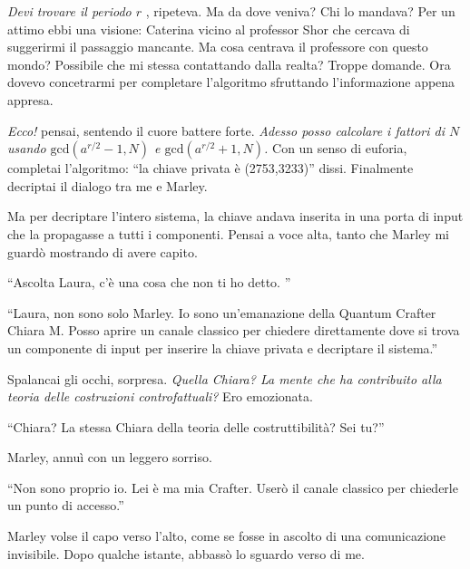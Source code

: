 \emph{Devi trovare il periodo \( r \) },  ripeteva.
 Ma da dove veniva? Chi lo mandava? Per un attimo ebbi una visione: Caterina vicino al professor Shor che cercava di suggerirmi il passaggio mancante. Ma cosa centrava il professore con questo mondo? Possibile che mi stessa contattando dalla realta? Troppe domande. Ora dovevo concetrarmi per completare l'algoritmo sfruttando l'informazione appena appresa.

\emph{Ecco!} pensai, sentendo il cuore battere forte. \emph{Adesso posso calcolare i fattori di \( N \) usando \(\text{gcd}(a^{r/2} - 1, N)\) e \(\text{gcd}(a^{r/2} + 1, N)\).} Con un senso di euforia, completai l'algoritmo: ``la chiave privata è  (2753,3233)'' dissi.
Finalmente decriptai il dialogo tra me e Marley.

Ma per decriptare l'intero sistema, la chiave andava inserita  in una porta di input che la propagasse a tutti i componenti. Pensai a voce alta, tanto che Marley mi guardò mostrando di avere capito.
\begin{dialogue}
 \enquote{Ascolta Laura, c'è una cosa che non ti ho detto. }
\end{dialogue}

\begin{dialogue}
 \enquote{Laura, non sono solo Marley. Io sono un'emanazione della Quantum Crafter Chiara M. Posso aprire un canale classico per chiedere direttamente dove si trova un componente di input per inserire la chiave privata e decriptare il sistema.}
\end{dialogue}

Spalancai gli occhi, sorpresa. \emph{Quella Chiara? La mente che ha contribuito alla teoria delle costruzioni controfattuali?} Ero emozionata.

\begin{dialogue}
 \enquote{Chiara? La stessa Chiara  della teoria delle costruttibilità? Sei tu?}
\end{dialogue}

Marley, annuì con un leggero sorriso. 

\begin{dialogue}
 \enquote{Non sono proprio io. Lei è ma mia Crafter. Userò il canale classico per chiederle un punto di accesso.}
\end{dialogue}

Marley volse il capo verso l'alto, come se fosse in ascolto di una comunicazione invisibile. Dopo qualche istante, abbassò lo sguardo verso di me.

